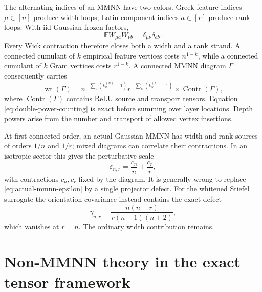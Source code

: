 \documentclass{article}
\newcommand{\E}{\mathbb E}
\begin{document}
The alternating indices of an MMNN have two colors.  Greek feature indices
\(\mu\in[n]\) produce width loops; Latin component indices \(a\in[r]\)
produce rank loops.  With iid Gaussian frozen factors,
\begin{equation}
\E W_{\mu a}W_{\nu b}=\delta_{\mu\nu}\delta_{ab}.
\end{equation}
Every Wick contraction therefore closes both a width and a rank strand.  A
connected cumulant of \(k\) empirical feature vertices costs
\(n^{1-k}\), while a connected cumulant of \(k\) Gram vertices costs
\(r^{1-k}\).  A connected MMNN diagram \(\Gamma\) consequently carries
\begin{equation}
\operatorname{wt}(\Gamma)
=n^{-\sum_v(k_v^{(n)}-1)}
r^{-\sum_w(k_w^{(r)}-1)}
\times\operatorname{Contr}(\Gamma),
\label{eq:double-power-counting}
\end{equation}
where \(\operatorname{Contr}(\Gamma)\) contains ReLU source and transport
tensors.  Equation \eqref{eq:double-power-counting} is exact before summing
over layer locations.  Depth powers arise from the number and transport of
allowed vertex insertions.

At first connected order, an actual Gaussian MMNN has width and rank sources
of orders \(1/n\) and \(1/r\); mixed diagrams can correlate their
contractions.  In an isotropic sector this gives
the perturbative scale
\begin{equation}
\varepsilon_{n,r}=\frac{c_n}{n}+\frac{c_r}{r},
\label{eq:actual-mmnn-epsilon}
\end{equation}
with contractions \(c_n,c_r\) fixed by the diagram.  It is generally wrong
to replace \eqref{eq:actual-mmnn-epsilon} by a single projector defect.  For
the whitened Stiefel surrogate the orientation covariance instead contains
the exact defect
\begin{equation}
\gamma_{n,r}=\frac{n(n-r)}{r(n-1)(n+2)},
\label{eq:gamma}
\end{equation}
which vanishes at \(r=n\).  The ordinary width contribution remains.

\section{Non-MMNN theory in the exact tensor framework}
\label{sec:relu-recursion}
\end{document}
